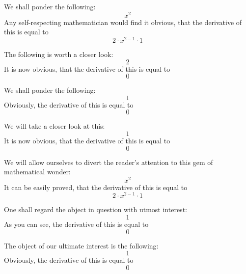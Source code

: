 \documentclass{article}
\begin{document}
We shall ponder the following:
\begin{equation}
x ^{2 } 
\end{equation}
Any self-respecting mathematician would find it obvious, that the derivative of this is equal to
\begin{equation}
2 \cdot x ^{2 - 1 } \cdot 1 
\end{equation}

The following is worth a closer look:
\begin{equation}
2 
\end{equation}
It is now obvious, that the derivative of this is equal to
\begin{equation}
0 
\end{equation}

We shall ponder the following:
\begin{equation}
1 
\end{equation}
Obviously, the derivative of this is equal to
\begin{equation}
0 
\end{equation}

We will take a closer look at this:
\begin{equation}
1 
\end{equation}
It is now obvious, that the derivative of this is equal to
\begin{equation}
0 
\end{equation}

We will allow ourselves to divert the reader's attention to this gem of mathematical wonder:
\begin{equation}
x ^{2 } 
\end{equation}
It can be easily proved, that the derivative of this is equal to
\begin{equation}
2 \cdot x ^{2 - 1 } \cdot 1 
\end{equation}

One shall regard the object in question with utmost interest:
\begin{equation}
1 
\end{equation}
As you can see, the derivative of this is equal to
\begin{equation}
0 
\end{equation}

The object of our ultimate interest is the following:
\begin{equation}
1 
\end{equation}
Obviously, the derivative of this is equal to
\begin{equation}
0 
\end{equation}
\end{document}
